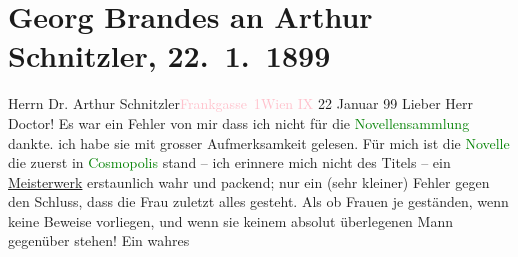 

               \section[Georg Brandes an Arthur Schnitzler, 22. 1. 1899]{ Georg Brandes an Arthur Schnitzler, 22. 1. 1899}\nopagebreak{}\rehead{ }\normalsize\beginnumbering{} \toendnotes[C]{\smallbreak\pagebreak[2]} 
\toendnotes[C]{\smallbreak}\pstart{}{\pb}Herrn Dr. Arthur
                        Schnitzler\pend{}\pstart{}\textcolor{pink}{Frankgasse 1}{}\ledrightnote{\textcolor{pink}{Frankgasse}}\pend{}\pstart{}\textcolor{pink}{Wien IX}{}\ledrightnote{\textcolor{pink}{IX., Alsergrund}}\pend{}{\bigskip}\pstart
           \raggedleft{}{\pb}22 Januar 99\pend
           \pstart
           Lieber Herr Doctor! Es war ein Fehler von mir dass ich nicht
                    für die \textcolor{green}{Novellensammlung}{}
                    dankte. ich habe sie mit grosser Aufmerksamkeit gelesen. Für mich ist die \textcolor{green}{Novelle}{} die zuerst in \textcolor{green}{Cosmopolis}{}\ledrightnote{\textcolor{green}{Cosmopolis}} stand – ich erinnere mich nicht des
                    Titels – ein \uline{Meisterwerk} erstaunlich wahr und
                    packend; nur ein (sehr kleiner) Fehler gegen den Schluss, dass die Frau zuletzt
                    alles gesteht. Als ob Frauen je geständen, wenn keine Beweise vorliegen, und
                    wenn sie keinem absolut überlegenen Mann gegenüber stehen! Ein wahres
